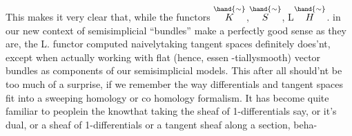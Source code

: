\margin{[} This makes it very clear that, while the functors $\overset{\hand{\sim}}{K}$,$\overset{\hand{\sim}}{S}$, L$\overset{\hand{\sim}}{H}$. in our
new context of semisimplicial ``bundles'' make a perfectly good sense as
they are, the L\hand{$\Pi$}. functor computed naively\hand{(}taking tangent spaces\hand{)}
definitely does'nt, except when actually working with flat (hence, essen
-tiallysmooth) vector bundles as components of our semisimplicial models.
This after all should'nt be too much of a surprise, if we remember the
way differentials and tangent spaces fit into a sweeping homology or co
homology formalism. It has become  quite familiar to peoplein the
knowthat taking the sheaf of 1-differentials say, or it's dual, or
 a sheaf of 1-differentials or a tangent sheaf along a section, beha-%

